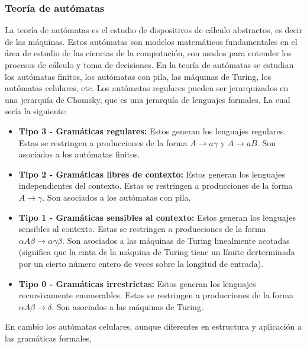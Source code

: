 \subsubsection{Teor\'ia de aut\'omatas}
    \label{sec:TeoriaAutomatas}
    La teor\'ia de aut\'omatas es el estudio de dispositivos de c\'alculo abstractos, es decir de las m\'aquinas.\cite{Hopcroft1979}
        Estos aut\'omatas son modelos matem\'aticos fundamentales en el \'area de estudio de las ciencias de la computaci\'on, 
        son usados para entender los procesos de c\'alculo y toma de decisiones. En la teor\'ia de aut\'omatas se estudian
        los aut\'omatas finitos, los aut\'omatas con pila, las m\'aquinas de Turing, los aut\'omatas celulares, etc.
        Los aut\'omatas regulares pueden ser jerarquizados en una jerarqu\'ia de Chomsky, que es una jerarqu\'ia de lenguajes formales.
        La cual ser\'ia la siguiente\cite{Aranda2006}:
        \begin{itemize}
            \item \textbf{Tipo 3 - Gram\'aticas regulares:} Estos generan los lenguajes regulares.
                Estas se restringen a producciones de la forma $A \rightarrow a\gamma$ y $A \rightarrow aB$. Son 
                asociados a los aut\'omatas finitos.
            \item \textbf{Tipo 2 - Gram\'aticas libres de contexto:} Estos generan los lenguajes independientes del contexto.
                Estas se restringen a producciones de la forma $A \rightarrow \gamma$. Son asociados a los aut\'omatas con pila.
            \item \textbf{Tipo 1 - Gram\'aticas sensibles al contexto:} Estos generan los lenguajes sensibles al contexto.
                Estas se restringen a producciones de la forma ${\alpha}A{\beta} \rightarrow {\alpha}{\gamma}{\beta}$. 
                Son asociados a las m\'aquinas de Turing linealmente acotadas (significa que la cinta de la m\'aquina de Turing
                tiene un l\'imite derterminada por un cierto n\'umero entero de veces sobre la longitud de entrada).
            \item \textbf{Tipo 0 - Gram\'aticas irrestrictas:} Estos generan los lenguajes recursivamente enumerables.
                Estas se restringen a producciones de la forma ${\alpha}A{\beta} \rightarrow {\delta}$. Son asociados a las m\'aquinas de Turing.
        \end{itemize}
    \vskip 0.5cm
    En cambio los aut\'omatas celulares, aunque diferentes en estructura y aplicaci\'on a las gram\'aticas formales, 
